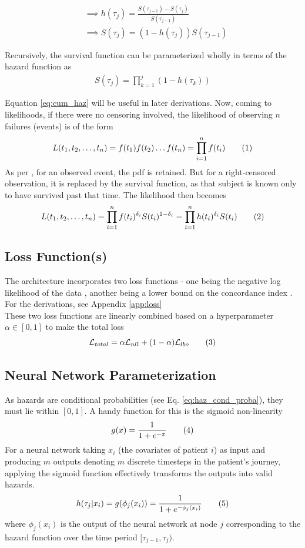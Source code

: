 \documentclass[%
 twocolumn,
 reprint,
 amsmath,amssymb,
 aps,nofootinbib
]{revtex4-2}
\newcommand\numberthis{\addtocounter{equation}{1}\tag{\theequation}} %
\begin{document}
\begin{align*}
&\implies  h(\tau_j) = \frac{S(\tau_{j-1}) - S(\tau_j)}{S(\tau_{j-1})}\\
&\implies S(\tau_j) = (1 - h(\tau_j))S(\tau_{j-1})
\end{align*}

Recursively, the survival function can be parameterized wholly in terms of the hazard function as
\begin{align}
S(\tau_j) = \prod_{k=1}^{j}(1 - h(\tau_k)) \label{eq:cum_haz}
\end{align}

Equation \ref{eq:cum_haz} will be useful in later derivations. Now, coming to likelihoods, if there were no censoring involved, the likelihood of observing $n$ failures (events) is of the form
\[
L(t_1 , t_2 , \ldots , t_n) = f(t_1)f(t_2)\ldots f(t_n)=\prod^{n}_{i=1}f(t_i) \numberthis  \label{eq:likelihood_no_censor}
\]
As per \cite{Moore_2016}, for an observed event, the pdf is retained. But for a right-censored observation, it is replaced by the survival function, as that subject is known only to have survived past that time. The likelihood then becomes
\[
L(t_1 , t_2 , \ldots , t_n) = \prod^{n}_{i=1}f(t_i)^{\delta_i}S(t_i)^{1-\delta_i}=\prod^{n}_{i=1}h(t_i)^{\delta_i}S(t_i) \numberthis  \label{eq:likelihood_censor}
\]

\subsection{\label{loss}Loss Function(s)}
The architecture incorporates two loss functions - one being the negative log likelihood of the data \cite{kvamme_continuous_2019}, another being a lower bound on the concordance index \cite{raykar_cindex}. For the derivations, see Appendix \ref{app:loss}\\

These two loss functions are linearly combined based on a hyperparameter $\alpha \in [0,1]$ to make the total loss
\[
\mathcal{L}_{total} = \alpha\mathcal{L}_{nll} + (1 - \alpha)\mathcal{L}_{lbo} \numberthis  \label{eq:l_total}
\]

\subsection{\label{nn_param}Neural Network Parameterization}
As hazards are conditional probabilities (see Eq. \ref{eq:haz_cond_proba}), they must lie within $[0,1]$. A handy function for this is the sigmoid non-linearity
\[
g(x) = \frac{1}{1+e^{-x}} \numberthis  \label{eq:sigmoid}
\]
For a neural network taking $x_i$ (the covariates of patient $i$) as input and producing $m$ outputs denoting $m$ discrete timesteps in the patient's journey, applying the sigmoid function effectively transforms the outputs into valid hazards.
\[
h(\tau_j|x_i) = g(\phi_j(x_i)) = \frac{1}{1+e^{-\phi_j(x_i)}} \numberthis  \label{eq:nn_param}
\]
where $\phi_j(x_i)$ is the output of the neural network at node $j$ corresponding to the hazard function over the time period $[\tau_{j-1}, \tau_j)$.\\
\end{document}
